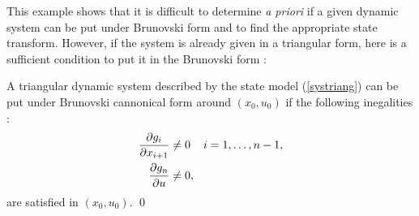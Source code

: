 This example shows that it is difficult to determine \textit{a priori} if a given dynamic system can be put under Brunovski form and to find the appropriate state transform. However, if the system is already given in a triangular form, here is a sufficient condition to put it in the Brunovski form :
\begin{lemme}{\blanc} \label{lemmeici}

A triangular dynamic system  described by the state model (\ref{systriang}) can be put under Brunovski cannonical form around $(x_0,u_0)$ if the following inegalities :
\begin{equation*} \begin{split}
\frac{\partial g_i}{\partial x_{i+1}} &\neq 0 \hh \hh i=1, \ldots, n-1, \\
\frac{\partial g_n}{\partial u} &\neq 0,
\end{split} \end{equation*}
are satisfied in $(x_0,u_0)$.
\qed
\end{lemme}
\vv

